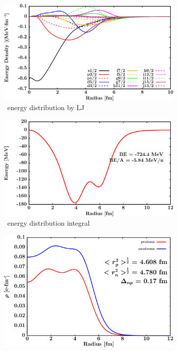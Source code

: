 \begin{figure}[hbtp]
    \begin{subfigure}{0.45\textwidth}
        \centering
        \includegraphics[width=\linewidth]{figures/sn124_EnergyDist.png}
        \caption{\snFour\ energy distribution by LJ}
        \label{DOMFitData_sn124_proton_energyDistInt}
    \end{subfigure}\hspace{6pt}
    \begin{subfigure}{0.45\textwidth}
        \centering
        \includegraphics[width=\linewidth]{figures/sn124_EnergyDistIntegral.png}
        \caption{\snFour\ energy distribution integral}
        \label{DOMFitData_sn124_neutron_energyDistInt}
    \end{subfigure}\vspace{0.4in}
    \begin{subfigure}{0.70\textwidth}
        \centering
        \includegraphics[width=\linewidth]{figures/sn124_matterDensity.png}

\end{subfigure}
\end{figure}

